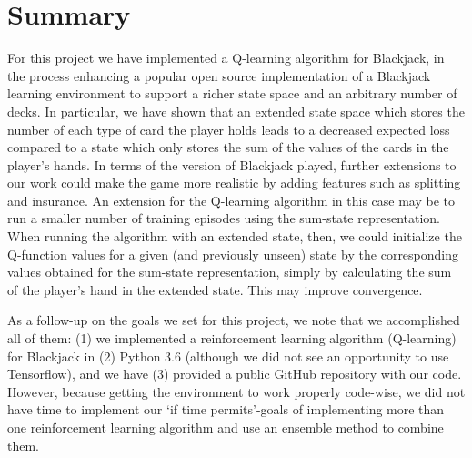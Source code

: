 \section{Summary} \label{sec:summary}
For this project we have implemented a Q-learning algorithm for Blackjack, in the process
enhancing a popular open source implementation of a Blackjack learning environment to
support a richer state space and an arbitrary number of decks. In particular, we have shown 
that an extended state space which stores the number of each type of card the player holds 
leads to a decreased expected loss compared to a state which only stores the sum of the 
values of the cards in the player's hands. In terms of the version of Blackjack played,
further extensions to our work could make the game more realistic by adding features such
as splitting and insurance. An extension for the Q-learning algorithm in this case may be
to run a smaller number of training episodes using the sum-state representation.
When running the algorithm with an extended state, then, we could initialize the Q-function
values for a given (and previously unseen) state by the corresponding values obtained for
the sum-state representation, simply by calculating the sum of the player's hand in the
extended state. This may improve convergence.

As a follow-up on the goals we set for this project, we note that we accomplished all of
them: (1) we implemented a reinforcement learning algorithm (Q-learning) for Blackjack
in (2) Python 3.6 (although we did not see an opportunity to use Tensorflow), and
we have (3) provided a public GitHub repository with our code. However, because getting the 
environment to work properly code-wise, we did not have time to implement our `if time permits'-goals
of implementing more than one reinforcement learning algorithm and use an ensemble method to
combine them.

